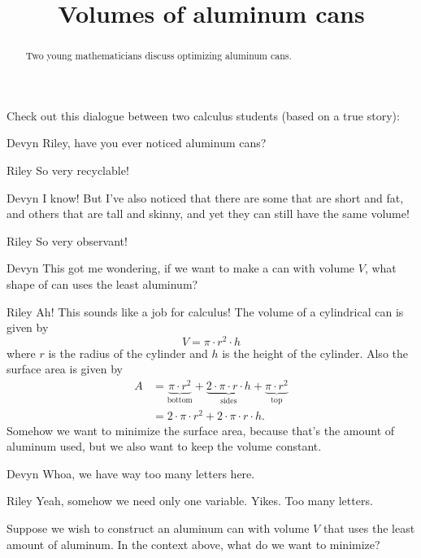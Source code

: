 \documentclass{ximera}
\title[Break-Ground:]{Volumes of aluminum cans}
\begin{document}
\begin{abstract}
Two young mathematicians discuss optimizing aluminum cans.
\end{abstract}
\maketitle

Check out this dialogue between two calculus students (based on a true
story):

\begin{dialogue}
\item[Devyn] Riley, have you ever noticed aluminum cans?
\item[Riley] So very recyclable! 
\item[Devyn] I know! But I've also noticed that there are some that
  are short and fat, and others that are tall and skinny, and yet they
  can still have the same volume!
\item[Riley] So very observant! 
\item[Devyn] This got me wondering, if we want to make a can with
  volume $V$, what shape of can uses the least aluminum?
\item[Riley] Ah! This sounds like a job for calculus!  The volume of a cylindrical can is given by
  \[
  V = \pi \cdot r^2 \cdot h
  \]
  where $r$ is the radius of the cylinder and $h$ is the height of the
  cylinder. Also the surface area is given by
  \begin{align*}
    A &= \underbrace{\pi \cdot r^2}_{\text{bottom}} + \underbrace{2\cdot\pi \cdot r\cdot h}_{\text{sides}} + \underbrace{\pi \cdot r^2}_{\text{top}}\\
    &= 2\cdot \pi \cdot r^2 + 2\cdot\pi \cdot r\cdot h.    
  \end{align*}
  Somehow we want to minimize the surface area, because that's the
  amount of aluminum used, but we also want to keep the volume constant.
\item[Devyn] Whoa, we have way too many letters here.
\item[Riley] Yeah, somehow we need only one variable. Yikes. Too many letters.
\end{dialogue}

\begin{problem}
  Suppose we wish to construct an aluminum can with volume $V$ that
  uses the least amount of aluminum. In the context above, what do we
  want to minimize?
  \begin{selectAll}
  \end{selectAll}
\end{problem}
\end{document}
